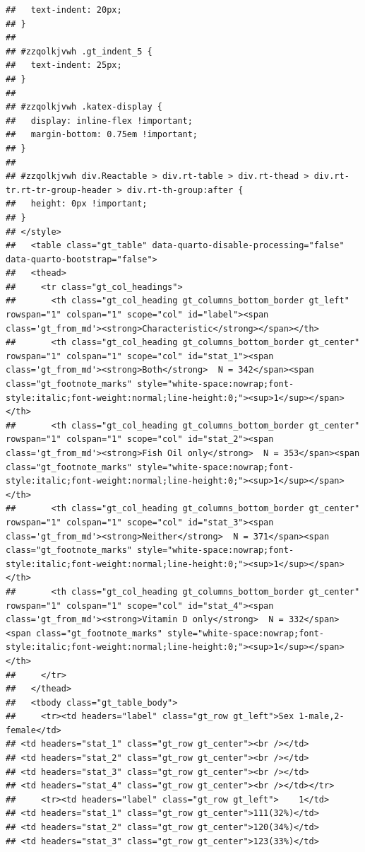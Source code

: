 \documentclass{article}
\begin{document}
\begin{verbatim}
##   text-indent: 20px;
## }
## 
## #zzqolkjvwh .gt_indent_5 {
##   text-indent: 25px;
## }
## 
## #zzqolkjvwh .katex-display {
##   display: inline-flex !important;
##   margin-bottom: 0.75em !important;
## }
## 
## #zzqolkjvwh div.Reactable > div.rt-table > div.rt-thead > div.rt-tr.rt-tr-group-header > div.rt-th-group:after {
##   height: 0px !important;
## }
## </style>
##   <table class="gt_table" data-quarto-disable-processing="false" data-quarto-bootstrap="false">
##   <thead>
##     <tr class="gt_col_headings">
##       <th class="gt_col_heading gt_columns_bottom_border gt_left" rowspan="1" colspan="1" scope="col" id="label"><span class='gt_from_md'><strong>Characteristic</strong></span></th>
##       <th class="gt_col_heading gt_columns_bottom_border gt_center" rowspan="1" colspan="1" scope="col" id="stat_1"><span class='gt_from_md'><strong>Both</strong>  N = 342</span><span class="gt_footnote_marks" style="white-space:nowrap;font-style:italic;font-weight:normal;line-height:0;"><sup>1</sup></span></th>
##       <th class="gt_col_heading gt_columns_bottom_border gt_center" rowspan="1" colspan="1" scope="col" id="stat_2"><span class='gt_from_md'><strong>Fish Oil only</strong>  N = 353</span><span class="gt_footnote_marks" style="white-space:nowrap;font-style:italic;font-weight:normal;line-height:0;"><sup>1</sup></span></th>
##       <th class="gt_col_heading gt_columns_bottom_border gt_center" rowspan="1" colspan="1" scope="col" id="stat_3"><span class='gt_from_md'><strong>Neither</strong>  N = 371</span><span class="gt_footnote_marks" style="white-space:nowrap;font-style:italic;font-weight:normal;line-height:0;"><sup>1</sup></span></th>
##       <th class="gt_col_heading gt_columns_bottom_border gt_center" rowspan="1" colspan="1" scope="col" id="stat_4"><span class='gt_from_md'><strong>Vitamin D only</strong>  N = 332</span><span class="gt_footnote_marks" style="white-space:nowrap;font-style:italic;font-weight:normal;line-height:0;"><sup>1</sup></span></th>
##     </tr>
##   </thead>
##   <tbody class="gt_table_body">
##     <tr><td headers="label" class="gt_row gt_left">Sex 1-male,2-female</td>
## <td headers="stat_1" class="gt_row gt_center"><br /></td>
## <td headers="stat_2" class="gt_row gt_center"><br /></td>
## <td headers="stat_3" class="gt_row gt_center"><br /></td>
## <td headers="stat_4" class="gt_row gt_center"><br /></td></tr>
##     <tr><td headers="label" class="gt_row gt_left">    1</td>
## <td headers="stat_1" class="gt_row gt_center">111(32%)</td>
## <td headers="stat_2" class="gt_row gt_center">120(34%)</td>
## <td headers="stat_3" class="gt_row gt_center">123(33%)</td>

\end{verbatim}
\end{document}
